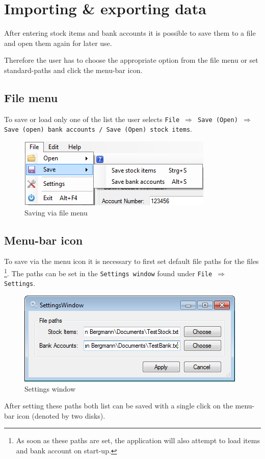 \section{Importing \& exporting data}
\label{sec:import_export}

After entering stock items and bank accounts it is possible to save them to a file and open them again for later use.

Therefore the user has to choose the appropriate option from the file menu or set standard-paths and click the menu-bar icon.

\subsection{File menu}
\label{subsec:file_menu}

To save or load only one of the list the user selects \texttt{File $\Rightarrow$ Save (Open) $\Rightarrow$ Save (open) bank accounts / Save (Open) stock items}.

\begin{figure}[H]
\begin{center}
\includegraphics[scale=0.8]{gfx/save_file_menu.png}
\caption{Saving via file menu}
\label{fig:save_file_menu}
\end{center}
\end{figure}

\subsection{Menu-bar icon}

To save via the menu icon it is necessary to first set default file paths for the files \footnote{As soon as these paths are set, the application will also attempt to load items and bank account on start-up.}. The paths can be set in the \texttt{Settings window} found under \texttt{File $\Rightarrow$ Settings}.

\begin{figure}[H]
\begin{center}
\includegraphics[scale=0.8]{gfx/settings_window.png}
\caption{Settings window}
\label{fig:settings_window}
\end{center}
\end{figure}

After setting these paths both list can be saved with a single click on the menu-bar icon (denoted by two disks).
